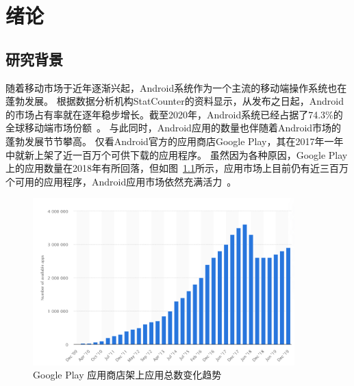 \chapter {绪论}
\label{chp:intro}

\section{研究背景}

随着移动市场于近年逐渐兴起，Android系统作为一个主流的移动端操作系统也在蓬勃发展。
根据数据分析机构StatCounter的资料显示，从发布之日起，Android的市场占有率就在逐年稳步增长。截至2020年，Android系统已经占据了74.3\%的全球移动端市场份额~\cite{MobileOSMktShare}。
与此同时，Android应用的数量也伴随着Android市场的蓬勃发展节节攀高。
仅看Android官方的应用商店Google Play，其在2017年一年中就新上架了近一百万个可供下载的应用程序。
虽然因为各种原因，Google Play上的应用数量在2018年有所回落，但如图~\ref{fig:app_number}所示，应用市场上目前仍有近三百万个可用的应用程序，Android应用市场依然充满活力~\cite{StatistaAppNumber}。

\begin{figure}[htbp]
	\centering
	\includegraphics[width=0.9\textwidth]{./Figures/edwin-intro-app-number.png}
	\caption{Google Play 应用商店架上应用总数变化趋势}
	\label{fig:app_number}
\end{figure}

